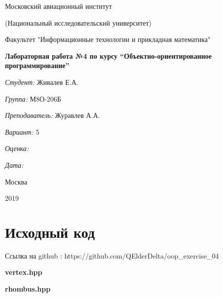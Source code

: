 \documentclass[a4paper, 12pt]{article}
\begin{document}
\thispagestyle{empty}	
\begin{center}
	Московский авиационный институт
	
	(Национальный исследовательский университет)
	
	Факультет "Информационные технологии и прикладная математика"
	
\end{center}
\vspace{40ex}
\begin{center}
	\textbf{\large{Лабораторная работа №4 по курсу \textquotedblleft Объектно-ориентированное программирование\textquotedblright}}
\end{center}
\vspace{40ex}
\begin{flushright}
	\textit{Студент: } Живалев Е.А.
	
	\vspace{2ex}
	\textit{Группа: } М8О-206Б
	
	\vspace{2ex}
	\textit{Преподаватель: } Журавлев А.А.
	
	\vspace{2ex}
	\textit{Вариант: } 5
	
	\vspace{2ex}
	\textit{Оценка: } \underline{\quad\quad\quad\quad\quad\quad}
	
	 \vspace{2ex}
	\textit{Дата: } \underline{\quad\quad\quad\quad\quad\quad}
	
\end{flushright}

\begin{vfill}
	\begin{center}
		Москва
		
		2019
	\end{center}	
\end{vfill}
\newpage
\section{Исходный код}

Ссылка на github : https://github.com/QElderDelta/oop\_exercise\_04

\vspace{3ex}
\textbf{\large{vertex.hpp}}


\vspace{3ex}
\textbf{\large{rhombus.hpp}}

\end{document}
